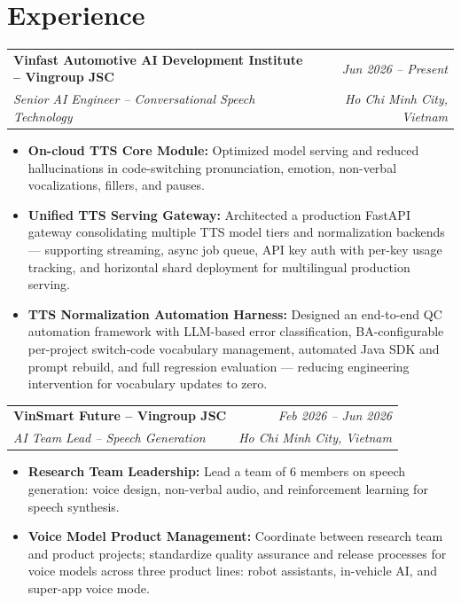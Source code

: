 \documentclass[10pt,a4paper]{article}
\makeatletter
\newcommand{\cventry}[4]{%
  \noindent
  \begin{tabular*}{\linewidth}{@{}l@{\extracolsep{\fill}}r@{}}
    {\color{accent}\textbf{#1}} & \textit{\small #2} \\
    \textit{\small #3} & \textit{\small #4}
  \end{tabular*}%
  \vspace{1pt}%
}
\makeatother
\begin{document}
\section{Experience}

\cventry{Vinfast Automotive AI Development Institute -- Vingroup JSC}{Jun 2026 -- Present}
        {Senior AI Engineer -- Conversational Speech Technology}{Ho Chi Minh City, Vietnam}
\begin{itemize}
  \item \textbf{On-cloud TTS Core Module:} Optimized model serving and reduced hallucinations in code-switching pronunciation, emotion, non-verbal vocalizations, fillers, and pauses.
  \item \textbf{Unified TTS Serving Gateway:} Architected a production FastAPI gateway consolidating multiple TTS model tiers and normalization backends — supporting streaming, async job queue, API key auth with per-key usage tracking, and horizontal shard deployment for multilingual production serving.
  \item \textbf{TTS Normalization Automation Harness:} Designed an end-to-end QC automation framework with LLM-based error classification, BA-configurable per-project switch-code vocabulary management, automated Java SDK and prompt rebuild, and full regression evaluation — reducing engineering intervention for vocabulary updates to zero.
\end{itemize}

\vspace{3pt}

\cventry{VinSmart Future -- Vingroup JSC}{Feb 2026 -- Jun 2026}
        {AI Team Lead -- Speech Generation}{Ho Chi Minh City, Vietnam}
\begin{itemize}
  \item \textbf{Research Team Leadership:} Lead a team of 6 members on speech generation: voice design, non-verbal audio, and reinforcement learning for speech synthesis.
  \item \textbf{Voice Model Product Management:} Coordinate between research team and product projects; standardize quality assurance and release processes for voice models across three product lines: robot assistants, in-vehicle AI, and super-app voice mode.
\end{itemize}
\end{document}
